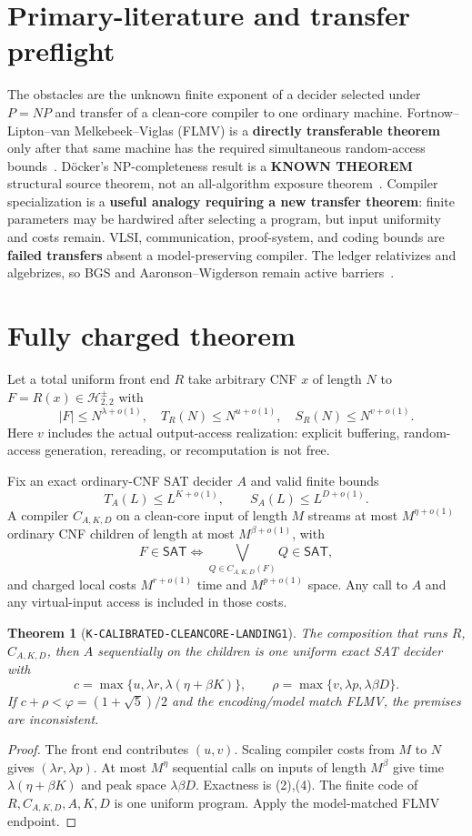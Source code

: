 \documentclass[11pt]{article}
\newtheorem{theorem}{Theorem}
\newcommand{\SAT}{\mathsf{SAT}}
\newcommand{\Hsigned}{\mathcal H^{\pm}_{2,2}}
\newcommand{\KNOWN}{\textbf{KNOWN THEOREM}}
\begin{document}
\section{Primary-literature and transfer preflight}
The obstacles are the unknown finite exponent of a decider selected under
$P=NP$ and transfer of a clean-core compiler to one ordinary machine.
Fortnow--Lipton--van Melkebeek--Viglas (FLMV) is a
\textbf{directly transferable theorem} only after that same machine has the
required simultaneous random-access bounds~\cite{FLMV05}. D\"ocker's
NP-completeness result is a \KNOWN{} structural source theorem, not an
all-algorithm exposure theorem~\cite{Docker20}. Compiler specialization is a
\textbf{useful analogy requiring a new transfer theorem}: finite parameters
may be hardwired after selecting a program, but input uniformity and costs
remain. VLSI, communication, proof-system, and coding bounds are
\textbf{failed transfers} absent a model-preserving compiler. The ledger
relativizes and algebrizes, so BGS and Aaronson--Wigderson remain active
barriers~\cite{BGS75,AW09}.

\section{Fully charged theorem}
Let a total uniform front end $R$ take arbitrary CNF $x$ of length $N$ to
$F=R(x)\in\Hsigned$ with
\[
 |F|\le N^{\lambda+o(1)},\quad T_R(N)\le N^{u+o(1)},\quad
 S_R(N)\le N^{v+o(1)}. \tag{2}
\]
Here $v$ includes the actual output-access realization: explicit buffering,
random-access generation, rereading, or recomputation is not free.

Fix an exact ordinary-CNF SAT decider $A$ and valid finite bounds
\[
 T_A(L)\le L^{K+o(1)},\qquad S_A(L)\le L^{D+o(1)}. \tag{3}
\]
A compiler $C_{A,K,D}$ on a clean-core input of length $M$ streams at most
$M^{\eta+o(1)}$ ordinary CNF children of length at most
$M^{\beta+o(1)}$, with
\[
 F\in\SAT\Longleftrightarrow\bigvee_{Q\in C_{A,K,D}(F)}Q\in\SAT, \tag{4}
\]
and charged local costs $M^{r+o(1)}$ time and $M^{p+o(1)}$ space. Any call to
$A$ and any virtual-input access is included in those costs.

\begin{theorem}[\texttt{K-CALIBRATED-CLEANCORE-LANDING1}]
The composition that runs $R$, $C_{A,K,D}$, then $A$ sequentially on the
children is one uniform exact SAT decider with
\[
 c=\max\{u,\lambda r,\lambda(\eta+\beta K)\},\qquad
 \rho=\max\{v,\lambda p,\lambda\beta D\}. \tag{5}
\]
If $c+\rho<\varphi=(1+\sqrt5)/2$ and the encoding/model match FLMV, the
premises are inconsistent.
\end{theorem}
\begin{proof}
The front end contributes $(u,v)$. Scaling compiler costs from $M$ to $N$
gives $(\lambda r,\lambda p)$. At most $M^\eta$ sequential calls on inputs of
length $M^\beta$ give time $\lambda(\eta+\beta K)$ and peak space
$\lambda\beta D$. Exactness is (2),(4). The finite code of
$R,C_{A,K,D},A,K,D$ is one uniform program. Apply the model-matched FLMV
endpoint.
\end{proof}
\end{document}
